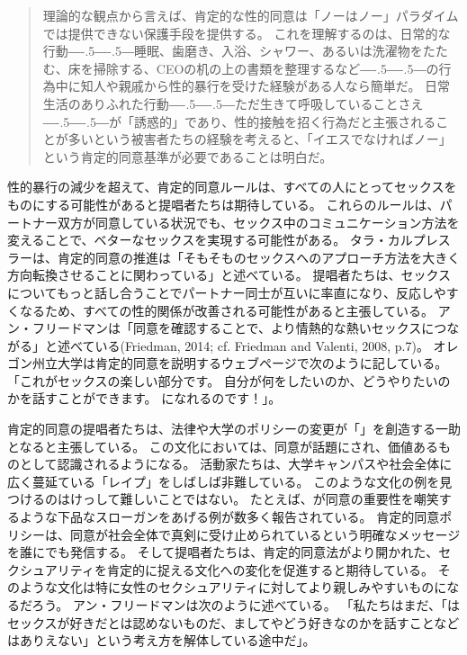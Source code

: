 \documentclass[paper=a4,book,openany]{jlreq}
\newcommand{\ig}[1]{}           %
\def\DDASH{―\kern-.5\zw―\kern-.5\zw―} %
\begin{document}
\begin{quote}
  理論的な観点から言えば、肯定的な性的同意は「ノーはノー」パラダイムでは提供できない保護手段を提供する。
これを理解するのは、日常的な行動{\DDASH}睡眠、歯磨き、入浴、シャワー、あるいは洗濯物をたたむ、床を掃除する、CEOの机の上の書類を整理するなど{\DDASH}の行為中に知人や親戚から性的暴行を受けた経験がある人なら簡単だ。
日常生活のありふれた行動{\DDASH}ただ生きて呼吸していることさえ{\DDASH}が「誘惑的」であり、性的接触を招く行為だと主張されることが多いという被害者たちの経験を考えると、「イエスでなければノー」という肯定的同意基準が必要であることは明白だ。
\citep[p.405]{vandervort12:_affir_sexual_consen_canad_law}
\end{quote}

性的暴行の減少を超えて、肯定的同意ルールは、すべての人にとってセックスをものにする可能性があると提唱者たちは期待している。
これらのルールは、パートナー双方が同意している状況でも、セックス中のコミュニケーション方法を変えることで、ベターなセックスを実現する可能性がある。
タラ・カルプレスラーは、肯定的同意の推進は「そもそものセックスへのアプローチ方法を大きく方向転換させることに関わっている」と述べている。
提唱者たちは、セックスについてもっと話し合うことでパートナー同士が互いに率直になり、反応しやすくなるため、すべての性的関係が改善される可能性があると主張している。
アン・フリードマン\ig{Ann Friedman}は「同意を確認することで、より情熱的な熱いセックスにつながる」と述べている(Friedman, 2014; cf. Friedman and Valenti, 2008, p.7)。
\nocite{friedman14:_oh_yes_means_yes}\nocite{friedman08:_yes_means_yes}
オレゴン州立大学は肯定的同意を説明するウェブページで次のように記している。
「これがセックスの楽しい部分です。
自分が何をしたいのか、どうやりたいのかを話すことができます。
になれるのです！」\citep{moyer14:_how_calif_yes_means_yes}。

肯定的同意の提唱者たちは、法律や大学のポリシーの変更が「」を創造する一助となると主張している。
この文化においては、同意が話題にされ、価値あるものとして認識されるようになる。
活動家たちは、大学キャンパスや社会全体に広く蔓延ている「レイプ」をしばしば非難している。
このような文化の例を見つけるのはけっして難しいことではない。
たとえば、が同意の重要性を嘲笑するような下品なスローガンをあげる例が数多く報告されている\citep{jackson18:_frat_barred_yale_years_is_back}。
肯定的同意ポリシーは、同意が社会全体で真剣に受け止められているという明確なメッセージを誰にでも発信する。
そして提唱者たちは、肯定的同意法がより開かれた、セクシュアリティを肯定的に捉える文化への変化を促進すると期待している。
そのような文化は特に女性のセクシュアリティに対してより親しみやすいものになるだろう。
アン・フリードマン\ig{Ann Friedman}は次のように述べている。
「私たちはまだ、「はセックスが好きだとは認めないものだ、ましてやどう好きなのかを話すことなどはありえない」という考え方を解体している途中だ」\citep{friedman14:_oh_yes_means_yes}。
\end{document}
